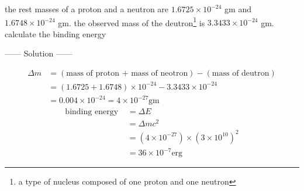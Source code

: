 \documentclass{article}
\begin{document}
\begin{example}
the rest masses of a proton and a neutron are $1.6725 \times 10^{-24}$ gm and $1.6748 \times 10^{-24}$ gm.
the observed mass of the deutron\footnote{a type of nucleus composed of one proton and one neutron}
is $3.3433 \times 10^{-24}$ gm. calculate the binding energy
\begin{center}
    ------ \textcolor{Solution}{Solution} ------
\end{center}
\begin{align*}
    \Delta m &= (\text{mass of proton + mass of neotron}) - (\text{mass of deutron})\\
             &= (1.6725 + 1.6748)\times 10^{-24} - 3.3433 \times 10^{-24}\\
             &= 0.004 \times 10^{-24} = 4 \times 10^{-27} \text{gm}
\end{align*}
\begin{align*}
    \text{binding energy } &= \Delta E \\
                           &= \Delta m c^2\\
                           &= \left(4 \times 10^{-27}\right)\times{\left(3 \times 10^{10}\right)}^2\\                           
                           &=36\times 10^{-7}\text{erg}
\end{align*}
\end{example}
\end{document}
